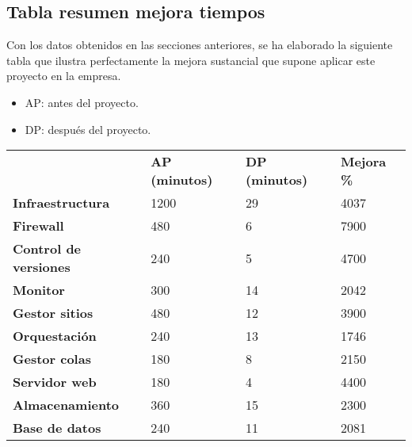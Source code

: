 \subsection{Tabla resumen mejora tiempos}
\begin{text}
	Con los datos obtenidos en las secciones anteriores, se ha elaborado la siguiente tabla que ilustra perfectamente la mejora sustancial que supone aplicar este proyecto en la empresa.
	\begin{itemize}
		\item AP: antes del proyecto.
		\item DP: después del proyecto.
	\end{itemize}
\end{text}

\begin{table}[!hbt]
	\begin{tabular}{llll}
		& \textbf{AP (minutos)} & \textbf{DP (minutos)} & \textbf{Mejora \%} \\
		\textbf{Infraestructura}       & 1200                                      & 29                                          & 4037               \\
		\textbf{Firewall}               & 480                                       & 6                                           & 7900               \\
		\textbf{Control de versiones}    & 240                                       & 5                                           & 4700               \\
		\textbf{Monitor}                & 300                                       & 14                                          & 2042               \\
		\textbf{Gestor sitios}       & 480                                       & 12                                          & 3900               \\
		\textbf{Orquestación} & 240                                       & 13                                          & 1746               \\
		\textbf{Gestor colas}          & 180                                       & 8                                           & 2150               \\
		\textbf{Servidor web}             & 180                                       & 4                                           & 4400               \\
		\textbf{Almacenamiento}    & 360                                       & 15                                          & 2300               \\
		\textbf{Base de datos}   & 240                                       & 11                                          & 2081              
	\end{tabular}
\end{table}
\clearpage

